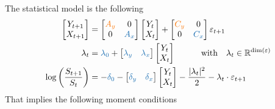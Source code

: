 \documentclass[11pt, letterpaper, notitlepage]{article}
\begin{document}
The statistical model is the following
\begin{align*}
\begin{bmatrix} 
Y_{t+1} \\ X_{t+1}
\end{bmatrix} &=  
\begin{bmatrix} 
\textcolor{orange}{A_y} & 0 \\ 0 & \textcolor{blue}{A_x}
\end{bmatrix}\begin{bmatrix} 
Y_{t} \\ X_{t}
\end{bmatrix} + 
\begin{bmatrix} 
\textcolor{orange}{C_y} & 0\\ 0 & \textcolor{blue}{C_x}
\end{bmatrix}\varepsilon_{t+1} \\
\lambda_t &= \textcolor{blue}{\lambda_0} + \begin{bmatrix} 
\textcolor{blue}{\lambda_y} & \textcolor{blue}{\lambda_x} 
\end{bmatrix}\begin{bmatrix} 
Y_{t} \\ X_{t}
\end{bmatrix} \quad\quad\quad \text{with}\quad \lambda_t \in \mathbb{R}^{\text{dim}(\varepsilon)}\\
\log\left( \frac{S_{t+1}}{S_t}\right) &= -\textcolor{blue}{\delta_0} - \begin{bmatrix} 
\textcolor{blue}{\delta_y} & \textcolor{blue}{\delta_x} 
\end{bmatrix}\begin{bmatrix} 
Y_{t} \\ X_{t}
\end{bmatrix} - \frac{|\lambda_t|^2}{2}  - \lambda_t \cdot  
\varepsilon_{t+1} 
\end{align*} 
That implies the following moment conditions
\end{document}
